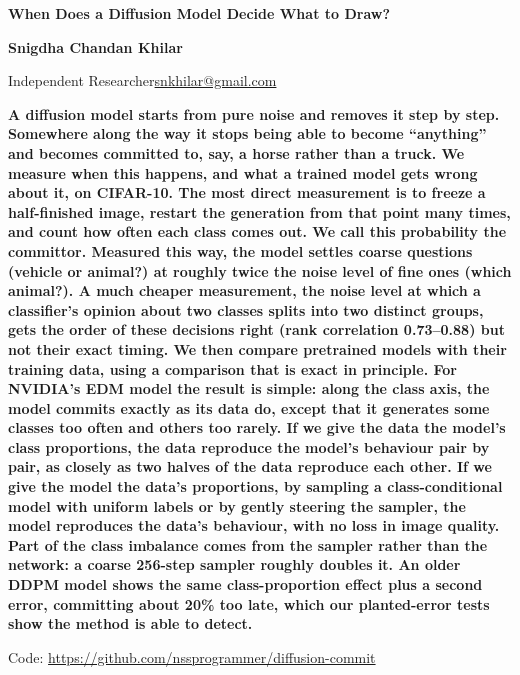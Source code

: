 \documentclass[11pt]{article}
\begin{document}
\thispagestyle{first}

\vspace*{2mm}
{\LARGE\bfseries When Does a Diffusion Model Decide What to Draw?\par}
\vspace{10pt}
{\normalsize\bfseries Snigdha Chandan Khilar\par}
{\small Independent Researcher\quad\textperiodcentered\quad\href{mailto:snkhilar@gmail.com}{snkhilar@gmail.com}\par}
\vspace{12pt}

{\bfseries
A diffusion model starts from pure noise and removes it step by step. Somewhere along the way it stops being able to become ``anything'' and becomes committed to, say, a horse rather than a truck. We measure when this happens, and what a trained model gets wrong about it, on CIFAR-10. The most direct measurement is to freeze a half-finished image, restart the generation from that point many times, and count how often each class comes out. We call this probability the committor. Measured this way, the model settles coarse questions (vehicle or animal?) at roughly twice the noise level of fine ones (which animal?). A much cheaper measurement, the noise level at which a classifier's opinion about two classes splits into two distinct groups, gets the order of these decisions right (rank correlation 0.73--0.88) but not their exact timing. We then compare pretrained models with their training data, using a comparison that is exact in principle. For NVIDIA's EDM model the result is simple: along the class axis, the model commits exactly as its data do, except that it generates some classes too often and others too rarely. If we give the data the model's class proportions, the data reproduce the model's behaviour pair by pair, as closely as two halves of the data reproduce each other. If we give the model the data's proportions, by sampling a class-conditional model with uniform labels or by gently steering the sampler, the model reproduces the data's behaviour, with no loss in image quality. Part of the class imbalance comes from the sampler rather than the network: a coarse 256-step sampler roughly doubles it. An older DDPM model shows the same class-proportion effect plus a second error, committing about 20\% too late, which our planted-error tests show the method is able to detect.
\par}
\vspace{4pt}
{\small Code: \url{https://github.com/nssprogrammer/diffusion-commit}\par}
\end{document}

